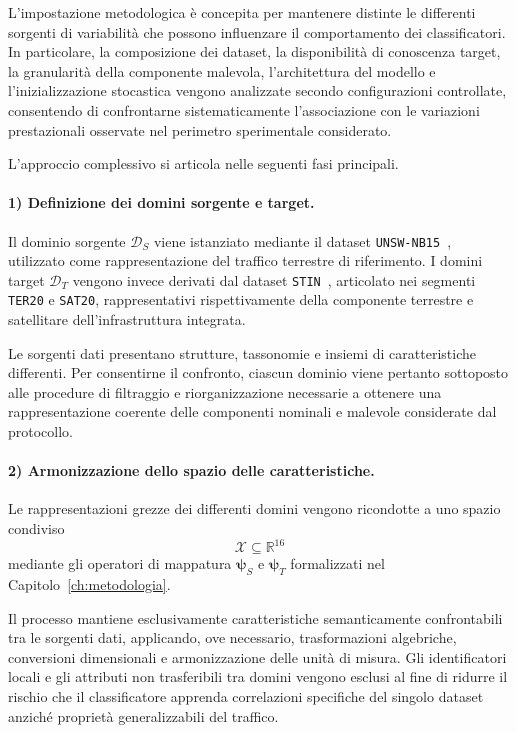 L'impostazione metodologica è concepita per mantenere distinte le differenti sorgenti di variabilità che possono influenzare il comportamento dei classificatori. 
In particolare, la composizione dei dataset, la disponibilità di conoscenza target, la granularità della componente malevola, l'architettura del modello e l'inizializzazione stocastica vengono analizzate secondo configurazioni controllate, consentendo di confrontarne sistematicamente l'associazione con le variazioni prestazionali osservate nel perimetro sperimentale considerato.

L'approccio complessivo si articola nelle seguenti fasi principali.

\paragraph{1) Definizione dei domini sorgente e target.}
Il dominio sorgente $\mathcal{D}_{S}$ viene istanziato mediante il dataset \texttt{UNSW-NB15}~\cite{nb15}, utilizzato come rappresentazione del traffico terrestre di riferimento. 
I domini target $\mathcal{D}_{T}$ vengono invece derivati dal dataset \texttt{STIN}~\cite{stin}, articolato nei segmenti \texttt{TER20} e \texttt{SAT20}, rappresentativi rispettivamente della componente terrestre e satellitare dell'infrastruttura integrata.

Le sorgenti dati presentano strutture, tassonomie e insiemi di caratteristiche differenti. 
Per consentirne il confronto, ciascun dominio viene pertanto sottoposto alle procedure di filtraggio e riorganizzazione necessarie a ottenere una rappresentazione coerente delle componenti nominali e malevole considerate dal protocollo.

\paragraph{2) Armonizzazione dello spazio delle caratteristiche.}
Le rappresentazioni grezze dei differenti domini vengono ricondotte a uno spazio condiviso
\[
    \mathcal{X} \subseteq \mathbb{R}^{16}
\]
mediante gli operatori di mappatura $\boldsymbol{\psi}_{S}$ e $\boldsymbol{\psi}_{T}$ formalizzati nel Capitolo~\ref{ch:metodologia}.

Il processo mantiene esclusivamente caratteristiche semanticamente confrontabili tra le sorgenti dati, applicando, ove necessario, trasformazioni algebriche, conversioni dimensionali e armonizzazione delle unità di misura. 
Gli identificatori locali e gli attributi non trasferibili tra domini vengono esclusi al fine di ridurre il rischio che il classificatore apprenda correlazioni specifiche del singolo dataset anziché proprietà generalizzabili del traffico.

